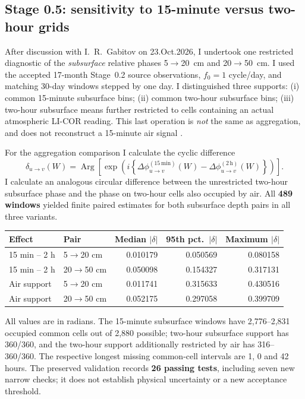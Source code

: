 \documentclass[11pt,letterpaper]{article}
\begin{document}
\subsection{Stage 0.5: sensitivity to 15-minute versus two-hour grids}
\label{sec:gridstudy}
After discussion with I.~R.~Gabitov on 23.Oct.2026,
I undertook one restricted diagnostic of the
\emph{subsurface} relative phases 5$\to$20~cm and
20$\to$50~cm. I used the accepted 17-month Stage~0.2
source observations, $f_0=1$ cycle/day, and matching
30-day windows stepped by one day.
I distinguished three supports:
(i) common 15-minute subsurface bins;
(ii) common two-hour subsurface bins;
(iii) two-hour subsurface means further restricted to
cells containing an actual atmospheric LI-COR reading.
This last operation is \emph{not} the same as aggregation,
and does not reconstruct a 15-minute air signal
\cite{gridpassport,gridvalidation}.

For the aggregation comparison I calculate the
cyclic difference
\begin{equation}
\delta_{u\to v}(W)=
\operatorname{Arg}\left[
\exp\left(i\left\{
\Delta\phi_{u\to v}^{(15\,\mathrm{min})}(W)
-\Delta\phi_{u\to v}^{(2\,\mathrm h)}(W)
\right\}\right)\right].
\label{eq:griddiff}
\end{equation}
I calculate an analogous circular difference between
the unrestricted two-hour subsurface phase and the
phase on two-hour cells also occupied by air. All
\textbf{489 windows} yielded finite paired estimates
for both subsurface depth pairs in all three variants.

\begin{center}
\small
\begin{tabular}{@{}llrrr@{}}
\toprule
Effect & Pair & Median $|\delta|$ & 95th pct.\ $|\delta|$ & Maximum $|\delta|$\\
\midrule
15 min -- 2 h & 5$\to$20 cm & 0.010179 & 0.050569 & 0.080158\\
15 min -- 2 h & 20$\to$50 cm & 0.050098 & 0.154327 & 0.317131\\
Air support & 5$\to$20 cm & 0.011741 & 0.315633 & 0.430516\\
Air support & 20$\to$50 cm & 0.052175 & 0.297058 & 0.399709\\
\bottomrule
\end{tabular}
\end{center}
All values are in radians. The 15-minute subsurface
windows have 2,776--2,831 occupied common cells
out of 2,880 possible; two-hour subsurface support
has 360/360, and the two-hour support additionally
restricted by air has 316--360/360. The respective
longest missing common-cell intervals are 1, 0 and
42 hours. The preserved validation records
\textbf{26 passing tests}, including seven new narrow
checks; it does not establish physical uncertainty
or a new acceptance threshold.
\end{document}
